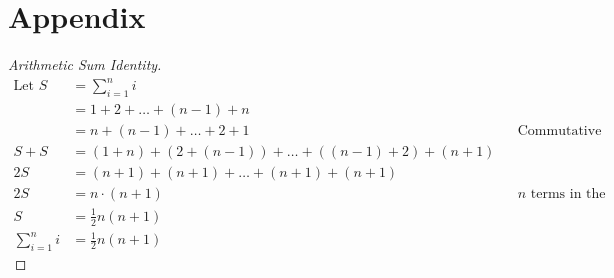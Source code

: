 \documentclass[12pt]{ucthesis}
\begin{document}
\chapter{Appendix}
\appendix
\label{app:proofs}

\begin{proof}[Arithmetic Sum Identity]
\label{proof:asi}
   \begin{align*}
     \text{Let } S & = \sum_{i=1}^{n}i\\
      & = 1 + 2 + \dots + (n - 1) + n\\
      & = n + (n - 1) + \dots + 2 + 1 && \text{Commutative Property}\\
      S + S & = (1 + n) + (2 + (n - 1)) + \dots + ((n - 1) + 2) + (n + 1)\\
      2S & = (n + 1) + (n + 1) + \dots + (n + 1) + (n + 1)\\
      2S & = n \cdot (n + 1) && \text{$n$ terms in the sum}\\
      S & = \frac{1}{2} n (n + 1)\\
      \sum_{i=1}^{n}i & = \frac{1}{2} n (n + 1)
   \end{align*}
\end{proof}

\clearpage


\end{document}
